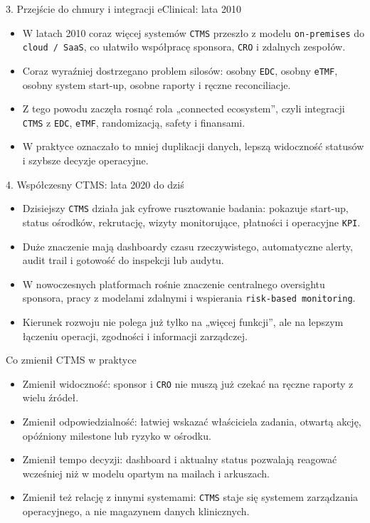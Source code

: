 \begin{frame}{3. Przejście do chmury i integracji eClinical: lata 2010}
  \begin{itemize}
    \item W latach 2010 coraz więcej systemów \texttt{CTMS} przeszło z modelu \texttt{on-premises} do \texttt{cloud / SaaS}, co ułatwiło współpracę sponsora, \texttt{CRO} i zdalnych zespołów.
    \item Coraz wyraźniej dostrzegano problem silosów: osobny \texttt{EDC}, osobny \texttt{eTMF}, osobny system start-up, osobne raporty i ręczne reconciliacje.
    \item Z tego powodu zaczęła rosnąć rola „connected ecosystem”, czyli integracji \texttt{CTMS} z \texttt{EDC}, \texttt{eTMF}, randomizacją, safety i finansami.
    \item W praktyce oznaczało to mniej duplikacji danych, lepszą widoczność statusów i szybsze decyzje operacyjne.
  \end{itemize}
\end{frame}

\begin{frame}{4. Współczesny CTMS: lata 2020 do dziś}
  \begin{itemize}
    \item Dzisiejszy \texttt{CTMS} działa jak cyfrowe rusztowanie badania: pokazuje start-up, status ośrodków, rekrutację, wizyty monitorujące, płatności i operacyjne \texttt{KPI}.
    \item Duże znaczenie mają dashboardy czasu rzeczywistego, automatyczne alerty, audit trail i gotowość do inspekcji lub audytu.
    \item W nowoczesnych platformach rośnie znaczenie centralnego oversightu sponsora, pracy z modelami zdalnymi i wspierania \texttt{risk-based monitoring}.
    \item Kierunek rozwoju nie polega już tylko na „więcej funkcji”, ale na lepszym łączeniu operacji, zgodności i informacji zarządczej.
  \end{itemize}
\end{frame}

\begin{frame}{Co zmienił CTMS w praktyce}
  \begin{itemize}
    \item Zmienił widoczność: sponsor i \texttt{CRO} nie muszą już czekać na ręczne raporty z wielu źródeł.
    \item Zmienił odpowiedzialność: łatwiej wskazać właściciela zadania, otwartą akcję, opóźniony milestone lub ryzyko w ośrodku.
    \item Zmienił tempo decyzji: dashboard i aktualny status pozwalają reagować wcześniej niż w modelu opartym na mailach i arkuszach.
    \item Zmienił też relację z innymi systemami: \texttt{CTMS} staje się systemem zarządzania operacyjnego, a nie magazynem danych klinicznych.
  \end{itemize}
\end{frame}

